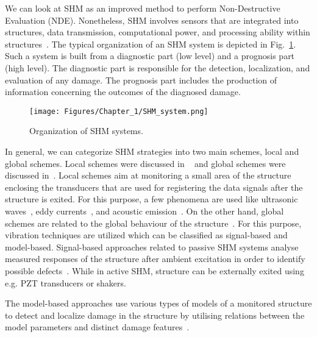 We can look at SHM as an improved method to perform Non-Destructive Evaluation (NDE). 
Nonetheless, SHM involves sensors that are integrated into structures, data transmission, computational power, and processing ability within structures~\cite{Balageas2010}. 
The typical organization of an SHM system is depicted in Fig.~\ref{fig:SHMsystem}. 
Such a system is built from a diagnostic part (low level) and a prognosis part (high level).
The diagnostic part is responsible for the detection, localization, and evaluation of any damage.
The prognosis part includes the production of information concerning the outcomes of the diagnosed damage.
\begin{figure} [!ht]
	\begin{center}
		\texttt{[image: Figures/Chapter\_1/SHM\_system.png]}
	\end{center}
	\caption{Organization of SHM systems.} 
	\label{fig:SHMsystem}
\end{figure}
In general, we can categorize SHM strategies into two main schemes, local and global schemes. 
Local schemes were discussed in ~\cite{Grimberg2001,Raghavan2007}
and global schemes were discussed in~\cite{Adams2002,Doebling1998,Uhl2004}. 
Local schemes aim at monitoring a small area of the structure enclosing the transducers that are used for registering the data signals after the structure is exited. 
For this purpose, a few phenomena are used like ultrasonic waves~\cite{Raghavan2007}, eddy currents~\cite{Grimberg2001}, and acoustic emission~\cite{Grosse2008}. 
On the other hand, global schemes are related to the global behaviour of the structure~\cite{Balageas2010}. 
For this purpose, vibration techniques are utilized which can be classified as signal-based and model-based.
Signal-based approaches related to passive SHM systems analyse measured responses of the structure after ambient excitation in order to identify possible defects~\cite{Stepinski2013}.
While in active SHM, structure can be externally exited using e.g. PZT transducers or shakers. 
 
The model-based approaches use various types of models of a monitored structure 
to detect and localize damage in the structure by utilising relations 
between the model parameters and distinct damage features~\cite{Stepinski2013}. 




%
%
%
%